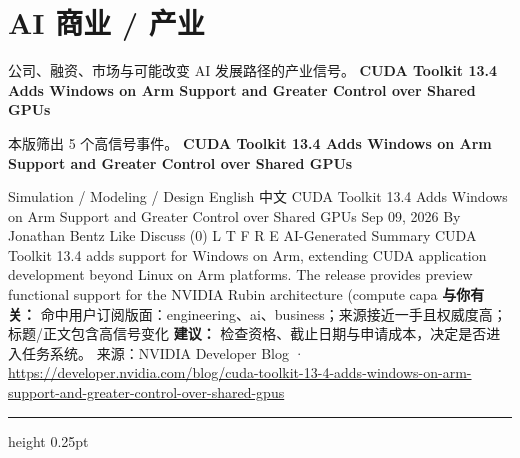 \documentclass[10.5pt]{ctexart}
\begin{document}
\section*{AI 商业 / 产业}
{\color{ormuted} 公司、融资、市场与可能改变 AI 发展路径的产业信号。}
\vspace{2mm}
{\LARGE\bfseries CUDA Toolkit 13.4 Adds Windows on Arm Support and Greater Control over Shared GPUs}\par
\vspace{1mm}
{\color{ormuted} 本版筛出 5 个高信号事件。}
\vspace{3mm}
{\Large\bfseries CUDA Toolkit 13.4 Adds Windows on Arm Support and Greater Control over Shared GPUs}\par
Simulation / Modeling / Design English 中文 CUDA Toolkit 13.4 Adds Windows on Arm Support and Greater Control over Shared GPUs Sep 09, 2026 By Jonathan Bentz Like Discuss (0) L T F R E AI-Generated Summary CUDA Toolkit 13.4 adds support for Windows on Arm, extending CUDA application development beyond Linux on Arm platforms. The release provides preview functional support for the NVIDIA Rubin architecture (compute capa
\textbf{与你有关：} 命中用户订阅版面：engineering、ai、business；来源接近一手且权威度高；标题/正文包含高信号变化
\textbf{建议：} 检查资格、截止日期与申请成本，决定是否进入任务系统。
{\footnotesize\color{ormuted} 来源：NVIDIA Developer Blog · \url{https://developer.nvidia.com/blog/cuda-toolkit-13-4-adds-windows-on-arm-support-and-greater-control-over-shared-gpus}}
\vspace{4mm}
\hrule height 0.25pt
\vspace{3mm}
\end{document}
